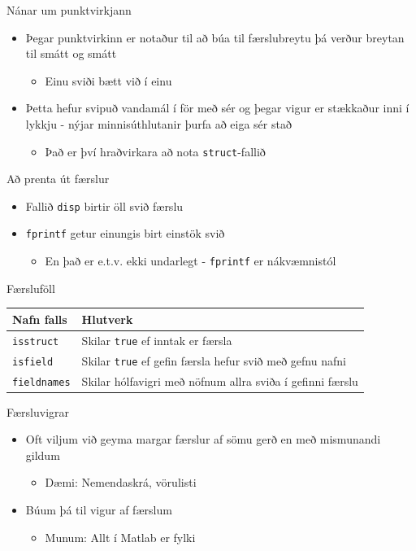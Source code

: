 \documentclass{beamer}
\begin{document}
\begin{frame}{Nánar um punktvirkjann}
\begin{itemize}
 \item Þegar punktvirkinn er notaður til að búa til færslubreytu þá verður breytan til smátt og smátt
 \begin{itemize}
  \item Einu sviði bætt við í einu
 \end{itemize}
 \item Þetta hefur svipuð vandamál í för með sér og þegar vigur er stækkaður inni í lykkju - nýjar minnisúthlutanir þurfa að eiga sér stað
 \begin{itemize}
  \item Það er því hraðvirkara að nota \texttt{struct}-fallið
 \end{itemize}
\end{itemize}
\end{frame}

\begin{frame}{Að prenta út færslur}
\begin{itemize}
 \item Fallið \texttt{disp} birtir öll svið færslu
 \item \texttt{fprintf} getur einungis birt einstök svið
 \begin{itemize}
  \item En það er e.t.v. ekki undarlegt - \texttt{fprintf} er nákvæmnistól
 \end{itemize}
\end{itemize}
\end{frame}

\begin{frame}{Færsluföll}
\begin{center}
\begin{tabular}{lp{7cm}}
\toprule
Nafn falls&Hlutverk\\
\midrule
\texttt{isstruct}&Skilar \texttt{true} ef inntak er færsla\\
\texttt{isfield}&Skilar \texttt{true} ef gefin færsla hefur svið með gefnu nafni\\
\texttt{fieldnames}&Skilar hólfavigri með nöfnum allra sviða í gefinni færslu\\
\bottomrule
\end{tabular}
\end{center}
\end{frame}

\begin{frame}{Færsluvigrar}
\begin{itemize}
 \item Oft viljum við geyma margar færslur af sömu gerð en með mismunandi gildum
 \begin{itemize}
  \item Dæmi: Nemendaskrá, vörulisti
 \end{itemize}
 \item Búum þá til vigur af færslum
 \begin{itemize}
  \item Munum: Allt í Matlab er fylki
 \end{itemize}
\end{itemize}
\end{frame}
\end{document}
